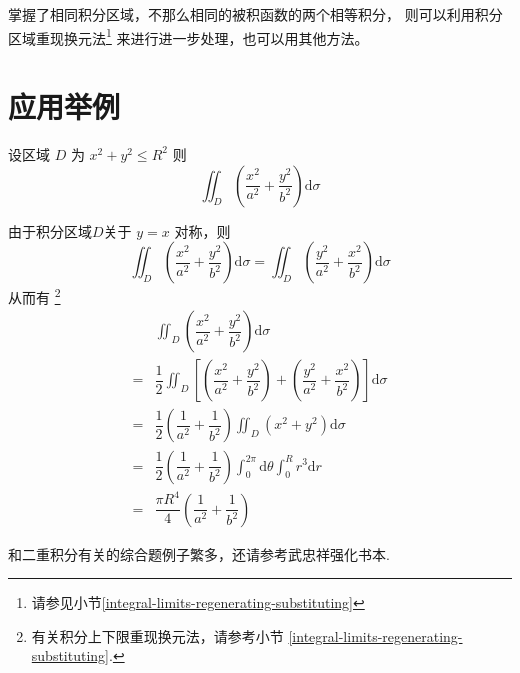 掌握了相同积分区域，不那么相同的被积函数的两个相等积分，
则可以利用积分区域重现换元法\footnote{请参见小节\ref{integral-limits-regenerating-substituting}}
来进行进一步处理，也可以用其他方法。

\section{应用举例}

\begin{example}
    设区域 $D$ 为 $x^2 + y^2 \leq R^2$ 则 
    \[
        \iint_D \left(\dfrac{x^2}{a^2} + \dfrac{y^2}{b^2}\right) \mathrm d\sigma 
    \]

    \cite[page 186]{we}

    由于积分区域$D$关于 $y = x$ 对称，则
    \[
        \iint_D \left(\dfrac{x^2}{a^2} + \dfrac{y^2}{b^2}\right) \mathrm d\sigma = 
        \iint_D \left(\dfrac{y^2}{a^2} + \dfrac{x^2}{b^2}\right) \mathrm d\sigma
    \]
    从而有
    \footnote{
        有关积分上下限重现换元法，请参考小节 \ref{integral-limits-regenerating-substituting}.
    }
    \begin{align*}
          &\iint_D \left(\dfrac{x^2}{a^2} + \dfrac{y^2}{b^2}\right) \mathrm d\sigma \\
        = &\dfrac{1}{2} \iint_D \left[
            \left(\dfrac{x^2}{a^2} + \dfrac{y^2}{b^2}\right) + 
            \left(\dfrac{y^2}{a^2} + \dfrac{x^2}{b^2}\right) 
        \right] \mathrm d\sigma \\
        = &\dfrac{1}{2} \left(\dfrac{1}{a^2} + \dfrac{1}{b^2}\right) \iint_D (x^2 + y^2) \mathrm d\sigma \\
        = &\dfrac{1}{2} \left(\dfrac{1}{a^2} + \dfrac{1}{b^2}\right) 
            \int_0^{2\pi} \mathrm d\theta \int_0^R r^3 \mathrm dr \\
        = &\dfrac{\pi R^4}{4} \left(\dfrac{1}{a^2} + \dfrac{1}{b^2}\right)
    \end{align*}

\end{example}

和二重积分有关的综合题例子繁多，还请参考武忠祥强化书本.

\cite[page 194, pdf 205]{we}

